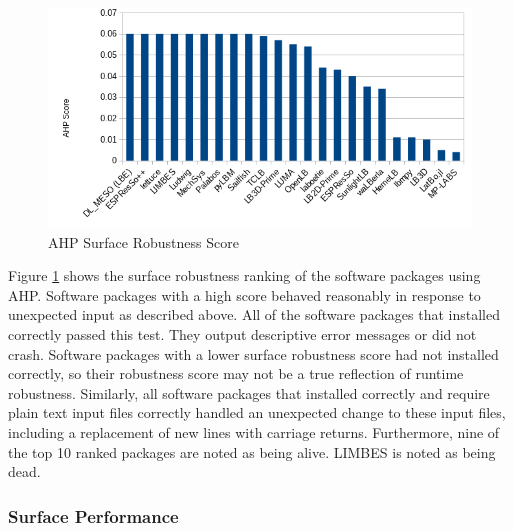 \documentclass[12pt, notitlepage]{article}
\begin{document}
\begin{figure}[h!]
	\begin{center}
		\includegraphics[width=1.0\textwidth]{robustness_chart}
		\caption{AHP Surface Robustness Score}
		\label{Fig_Robustness}
	\end{center}
\end{figure}

Figure \ref{Fig_Robustness} shows the surface robustness ranking of the software packages using AHP. Software packages with a high score behaved reasonably in response to unexpected input as described above. All of the software packages that installed correctly passed this test. They output descriptive error messages or did not crash. Software packages with a lower surface robustness score had not installed correctly, so their robustness score may not be a true reflection of runtime robustness. Similarly, all software packages that installed correctly and require plain text input files correctly handled an unexpected change to these input files, including a replacement of new lines with carriage returns. Furthermore, nine of the top 10 ranked packages are noted as being alive. LIMBES is noted as being dead.

\subsubsection{Surface Performance}
\end{document}
